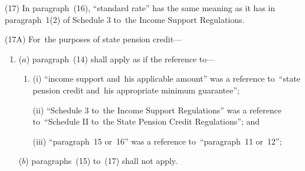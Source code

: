 \documentclass[12pt,a4paper]{article}
\begin{document}
(17) In paragraph~(16), “standard rate” has the same meaning as it has in paragraph~1(2) of Schedule 3 to~the Income Support Regulations.

(17A) For~the purposes of state pension credit—
\begin{enumerate}\item[]
($a$) paragraph~(14) shall apply as if the reference to—
\begin{enumerate}\item[]
(i) “income support and~his applicable amount” was a reference to~“state pension credit and~his appropriate minimum guarantee”;

(ii) “Schedule 3 to~the Income Support Regulations” was a reference to~“Schedule II to~the State Pension Credit Regulations”; and

(iii) “paragraph~15 or~16” was a reference to~“paragraph~11 or~12”;
\end{enumerate}

($b$) paragraphs~(15) to~(17) shall not apply.
\end{enumerate}

%
%
\end{document}
